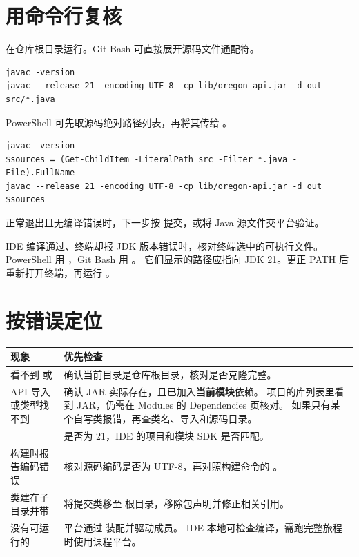\documentclass[UTF8,11pt,a4paper]{ctexart}
\begin{document}
\clearpage
\section{用命令行复核}

在仓库根目录运行。Git Bash 可直接展开源码文件通配符。
\begin{lstlisting}
javac -version
javac --release 21 -encoding UTF-8 -cp lib/oregon-api.jar -d out src/*.java
\end{lstlisting}

PowerShell 可先取源码绝对路径列表，再将其传给 。
\begin{lstlisting}
javac -version
$sources = (Get-ChildItem -LiteralPath src -Filter *.java -File).FullName
javac --release 21 -encoding UTF-8 -cp lib/oregon-api.jar -d out $sources
\end{lstlisting}
 正常退出且无编译错误时，下一步按
提交，或将 Java 源文件交平台验证。

\noindent IDE 编译通过、终端却报 JDK 版本错误时，核对终端选中的可执行文件。
PowerShell 用 ，Git Bash 用 。
它们显示的路径应指向 JDK 21。更正 PATH 后重新打开终端，再运行 。

\section{按错误定位}

\begin{center}\small
\begin{tabularx}{\linewidth}{@{}L{5.3cm}Y@{}}
\toprule
现象 & 优先检查 \\
\midrule
看不到  或  &
确认当前目录是仓库根目录，核对是否克隆完整。 \\
API 导入或类型找不到 &
确认 JAR 实际存在，且已加入\textbf{当前模块}依赖。
项目的库列表里看到 JAR，仍需在 \textsf{Modules} 的 \textsf{Dependencies} 页核对。
如果只有某个自写类报错，再查类名、导入和源码目录。 \\
 &
 是否为 21，IDE 的项目和模块 SDK 是否匹配。 \\
构建时报告编码错误 &
核对源码编码是否为 UTF-8，再对照构建命令的 。 \\
类建在子目录并带  &
将提交类移至  根目录，移除包声明并修正相关引用。 \\
没有可运行的  &
平台通过  装配并驱动成员。
IDE 本地可检查编译，需跑完整旅程时使用课程平台。 \\
\bottomrule
\end{tabularx}
\end{center}
\end{document}
